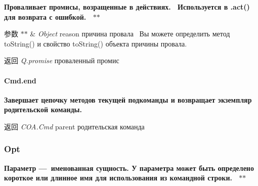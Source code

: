 {\bfseries {\bfseries {\bfseries {\bfseries {\bfseries {\bfseries  Проваливает промисы, возращенные в действиях.~\newline
 Используется в .act() для возврата с ошибкой.~\newline
 $\ast$$\ast$
\begin{DoxyParams}{参数}
{\em $\ast$$\ast$} & {\itshape Object} {\ttfamily reason} причина провала~\newline
 Вы можете определить метод to\+String() и свойство to\+String() объекта причины провала.~\newline
 {\bfseries }\\
\hline
\end{DoxyParams}
\begin{DoxyReturn}{返回}
{\bfseries } {\itshape Q.\+promise} проваленный промис
\end{DoxyReturn}
\paragraph*{Cmd.\+end}}}}}}}

{\bfseries {\bfseries {\bfseries {\bfseries {\bfseries {\bfseries  Завершает цепочку методов текущей подкоманды и возвращает экземпляр родительской команды.~\newline
 {\bfseries \begin{DoxyReturn}{返回}
{\itshape C\+O\+A.\+Cmd} {\ttfamily parent} родительская команда
\end{DoxyReturn}
\subsubsection*{Opt}}}}}}}}

{\bfseries {\bfseries {\bfseries {\bfseries {\bfseries {\bfseries {\bfseries  Параметр — именованная сущность. У параметра может быть определено короткое или длинное имя для использования из командной строки.~\newline
 $\ast$$\ast$ }}}}}}}